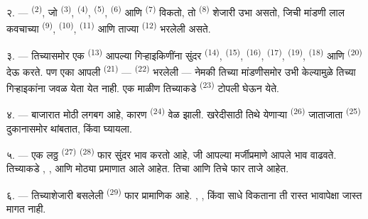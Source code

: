 २. ---  \textsuperscript{(2)}, जो  \textsuperscript{(3)},
 \textsuperscript{(4)},  \textsuperscript{(5)},
 \textsuperscript{(6)} आणि  \textsuperscript{(7)}
विकतो, तो  \textsuperscript{(8)} शेजारी उभा असतो, जिची मांडणी
लाल कवचाच्या  \textsuperscript{(9)}, 
\textsuperscript{(10)},  \textsuperscript{(11)} आणि ताज्या
 \textsuperscript{(12)} भरलेली असते.

३. --- तिच्यासमोर एक  \textsuperscript{(13)} आपल्या गिऱ्हाइकिणींना सुंदर
 \textsuperscript{(14)},  \textsuperscript{(15)},
 \textsuperscript{(16)},  \textsuperscript{(17)},
 \textsuperscript{(19)},  \textsuperscript{(18)} आणि
 \textsuperscript{(20)} देऊ करते. पण एका  आपली
 \textsuperscript{(21)} — 
\textsuperscript{(22)} भरलेली — नेमकी तिच्या मांडणीसमोर उभी केल्यामुळे तिच्या गिऱ्हाइकांना जवळ
येता येत नाही. एक माळीण तिच्याकडे  \textsuperscript{(23)} टोपली घेऊन येते.

\VUsaut{4.0mm}
\VUsaut{3.0mm}

४. --- बाजारात मोठी लगबग आहे, कारण  \textsuperscript{(24)} वेळ झाली.
खरेदीसाठी तिथे येणाऱ्या  \textsuperscript{(26)} जाताजाता
 \textsuperscript{(25)} दुकानासमोर थांबतात, 
किंवा  घ्यायला.

५. --- एक लठ्ठ  \textsuperscript{(27)}  \textsuperscript{(28)}
फार सुंदर  भाव करतो आहे, जी आपल्या मर्जीप्रमाणे आपले भाव वाढवते. तिच्याकडे
, ,  आणि  मोठ्या प्रमाणात आले आहेत.
तिचा  आणि तिचे  फार ताजे आहेत.

\VUsaut{4.0mm}
\VUsaut{3.0mm}

६. --- तिच्याशेजारी बसलेली  \textsuperscript{(29)} फार प्रामाणिक आहे.
, ,  किंवा साधे  विकताना ती
रास्त भावापेक्षा जास्त मागत नाही.

